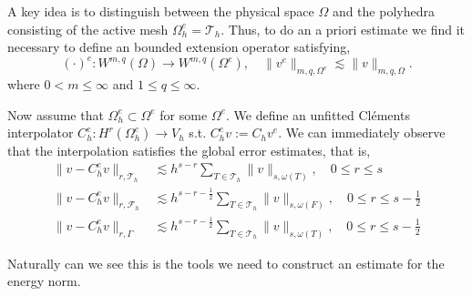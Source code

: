 A key idea is to distinguish between the physical space $\Omega $ and the polyhedra consisting of the active mesh $\Omega ^{e}_{h} = \mathcal{T}_{h}$. Thus, to do an
a priori estimate we find it necessary to define an bounded extension operator satisfying, \[
( \cdot ) ^{e}: W^{m,q}( \Omega )  \to W^{m,q} ( \Omega ^{e}), \quad \| v^{e} \|_{ m,q,\Omega ^{e}  }^{  } \lesssim \| v \|_{ m,q, \Omega  }^{  }.
\]
where $0< m \le \infty$ and $1 \le q \le \infty$.

Now assume that $\Omega _{h}^{e} \subset  \Omega^{e} $ for some $\Omega^{e}  $. We define an unfitted Cléments interpolator $C_{h}^{e}: H^{r}( \Omega ^{e}_{h}) \to V_{h}$
s.t.  $C ^{e} _{h} v := C _{h} v^{e} $.
We can immediately observe that the interpolation satisfies the global error estimates, that is,
\begin{align}
    \label{eq:bi_projection_estimates_1}
    \| v - C _{h}^{e} v \|_{  r, \mathcal{T} _{h} }^{  } & \lesssim h^{s-r}\sum_{T \in \mathcal{T}_h} \| v \|_{ s, \omega(T) }^{  }, \quad 0\le r\le s \\
    \label{eq:bi_projection_estimates_2}
\| v - C ^{e}_{h}v \|_{ r,\mathcal{F} _{h} }^{  } & \lesssim h^{s-r-\frac{1}{2}}\sum_{T \in \mathcal{T}_h} \| v \|_{ s, \omega(F)  }^{  }, \quad 0  \le  r \le   s- \frac{1}{2} \\
    \label{eq:bi_projection_estimates_3}
\| v - C ^{e}_{h}v \|_{ r, \Gamma }^{  } & \lesssim h^{s-r-\frac{1}{2}} \sum_{T \in \mathcal{T}_h}  \| v \|_{ s,  \omega(T)  }^{  }, \quad 0  \le  r \le   s- \frac{1}{2}
\end{align}

Naturally can we see this is the tools we need to construct an estimate for the energy norm.

